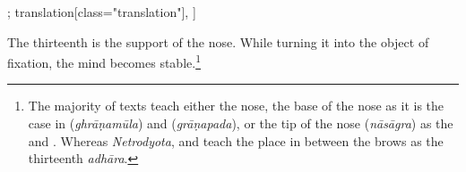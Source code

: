 \begin{alignment}[
  texts=edition[class="edition"];
  translation[class="translation"],
  ]
\begin{translation}
\begin{tlate}
      The thirteenth is the support of the nose. While turning it into the object of fixation, the mind becomes stable.\footnote{The majority of texts teach either the nose, the base of the nose as it is the case in  (\textit{ghrāṇamūla}) and  (\textit{grāṇapada}), or the tip of the nose (\textit{nāsāgra}) as the  and . Whereas \textit{Netrodyota},  and  teach the place in between the brows as the thirteenth \textit{adhāra}.}
      \clearpage
      \end{tlate}
  \end{translation}
\end{alignment}
\pagebreak %
